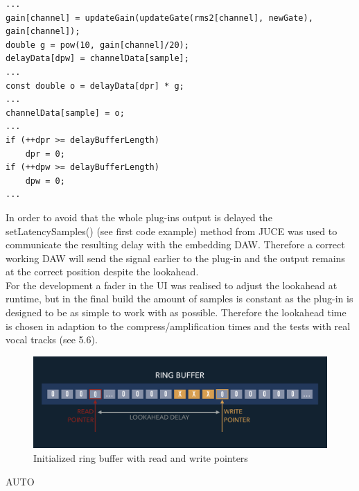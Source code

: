 \begin{lstlisting}[frame=single]
...
gain[channel] = updateGain(updateGate(rms2[channel], newGate),
gain[channel]);
double g = pow(10, gain[channel]/20);
delayData[dpw] = channelData[sample];
...
const double o = delayData[dpr] * g;
...
channelData[sample] = o;
...
if (++dpr >= delayBufferLength)
	dpr = 0;
if (++dpw >= delayBufferLength)
	dpw = 0;
...
\end{lstlisting}

In order to avoid that the whole plug-ins output is delayed the setLatencySamples() (see first code example) method from JUCE was used to communicate the resulting delay with the embedding DAW. Therefore a correct working DAW will send the signal earlier to the plug-in and the output remains at the correct position despite the lookahead.\\
For the development a fader in the UI was realised to adjust the lookahead at runtime, but in the final build the amount of samples is constant as the plug-in is designed to be as simple to work with as possible. Therefore the lookahead time is chosen in adaption to the compress/amplification times and the tests with real vocal tracks (see 5.6).

\begin{figure}[H]
\includegraphics[width=\textwidth]{images/ring_buffer}
\caption{Initialized ring buffer with read and write pointers}
\end{figure}

AUTO


